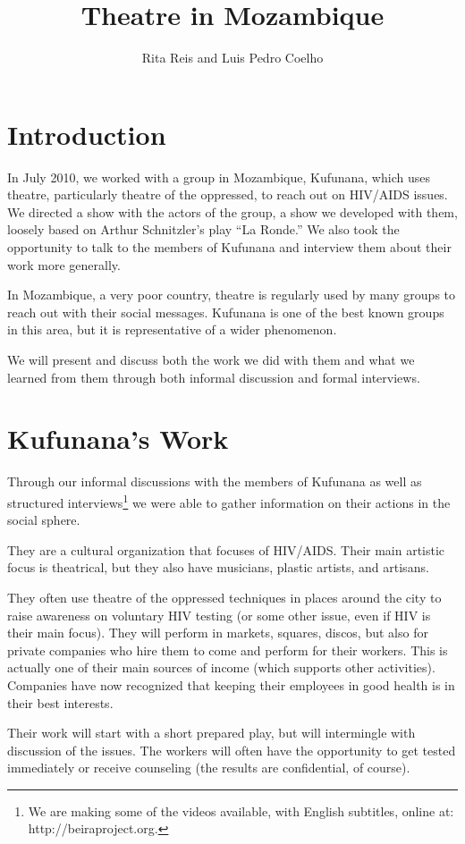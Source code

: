 \documentclass[article,twocolumn,twoside]{memoir}
\title{Theatre in Mozambique}
\author{Rita Reis and Luis Pedro Coelho}
\begin{document}
\maketitle

\chapter{Introduction}
In July 2010, we worked with a group in Mozambique, Kufunana, which uses
theatre, particularly theatre of the oppressed, to reach out on HIV/AIDS
issues. We directed a show with the actors of the group, a show we developed
with them, loosely based on Arthur Schnitzler's play ``La Ronde.'' We also took
the opportunity to talk to the members of Kufunana and interview them about
their work more generally.

In Mozambique, a very poor country, theatre is regularly used by many groups to
reach out with their social messages. Kufunana is one of the best known groups
in this area, but it is representative of a wider phenomenon.

We will present and discuss both the work we did with them and what we learned
from them through both informal discussion and formal interviews.

\chapter{Kufunana's Work}

Through our informal discussions with the members of Kufunana as well as
structured interviews\footnote{We are making some of the videos available, with
English subtitles, online at: http://beiraproject.org.} we were able to gather
information on their actions in the social sphere.

They are a cultural organization that focuses of HIV/AIDS. Their main artistic
focus is theatrical, but they also have musicians, plastic artists, and
artisans.

They often use theatre of the oppressed techniques in places around the city to
raise awareness on voluntary HIV testing (or some other issue, even if HIV is
their main focus). They will perform in markets, squares, discos, but also for
private companies who hire them to come and perform for their workers.  This is
actually one of their main sources of income (which supports other activities).
Companies have now recognized that keeping their employees in good health is in
their best interests.

Their work will start with a short prepared play, but will intermingle with
discussion of the issues. The workers will often have the opportunity to get
tested immediately or receive counseling (the results are confidential, of
course).
\end{document}
